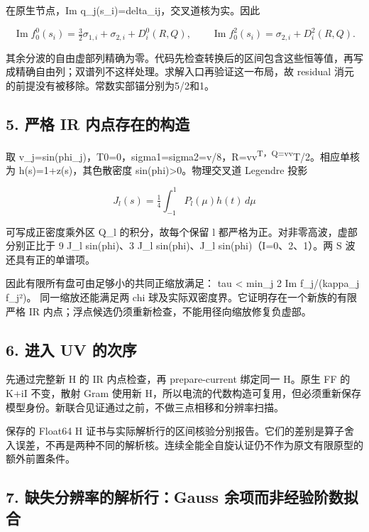 \documentclass[
  10pt,
  a4paper,
]{article}
\begin{document}
在原生节点，Im q\_j(s\_i)=delta\_ij，交叉道核为实。因此

\[
\operatorname{Im} f^0_0(s_i)=\tfrac32\sigma_{1,i}+\sigma_{2,i}+D^0_i(R,Q),
\qquad
\operatorname{Im} f^2_0(s_i)=\sigma_{2,i}+D^2_i(R,Q).
\]

其余分波的自由虚部列精确为零。代码先检查转换后的区间包含这些恒等值，再写成精确自由列；双谱列不这样处理。求解入口再验证这一布局，故
residual 消元的前提没有被移除。常数实部锚分别为5/2和1。

\subsection{5. 严格 IR
内点存在的构造}\label{ux4e25ux683c-ir-ux5185ux70b9ux5b58ux5728ux7684ux6784ux9020}

取
v\_j=sin(phi\_j)，T0=0，sigma1=sigma2=v/8，R=vv\textsuperscript{T，Q=vv}T/2。相应单核为
h(s)=1+z(s)，其色散密度 sin(phi)\textgreater0。物理交叉道 Legendre 投影

\[
J_l(s)=\tfrac14\int_{-1}^1 P_l(\mu)h(t)\,d\mu
\]

可写成正密度乘外区 Q\_l 的积分，故每个保留 l
都严格为正。对非零高波，虚部分别正比于 9 J\_l sin(phi)、3 J\_l
sin(phi)、J\_l sin(phi)（I=0、2、1）。两 S 波还具有正的单谱项。

因此有限所有盘可由足够小的共同正缩放满足： tau \textless{} min\_j 2 Im
f\_j/(kappa\_j \textbar f\_j\textbar²)。 同一缩放还能满足两 chi
球及实际双密度界。它证明存在一个新族的有限严格 IR
内点；浮点候选仍须重新检查，不能用径向缩放修复负虚部。

\subsection{6. 进入 UV 的次序}\label{ux8fdbux5165-uv-ux7684ux6b21ux5e8f}

先通过完整新 H 的 IR 内点检查，再 prepare-current 绑定同一 H。原生 FF 的
K+iI 不变，散射 Gram 使用新
H，所以电流的代数构造可复用，但必须重新保存模型身份。新联合见证通过之前，不做三点相移和分辨率扫描。

保存的 Float64 H
证书与实际解析行的区间核验分别报告。它们的差别是算子舍入误差，不再是两种不同的解析核。连续全能全自旋认证仍不作为原文有限原型的额外前置条件。

\subsection{7. 缺失分辨率的解析行：Gauss
余项而非经验阶数拟合}\label{ux7f3aux5931ux5206ux8fa8ux7387ux7684ux89e3ux6790ux884cgauss-ux4f59ux9879ux800cux975eux7ecfux9a8cux9636ux6570ux62dfux5408}
\end{document}
